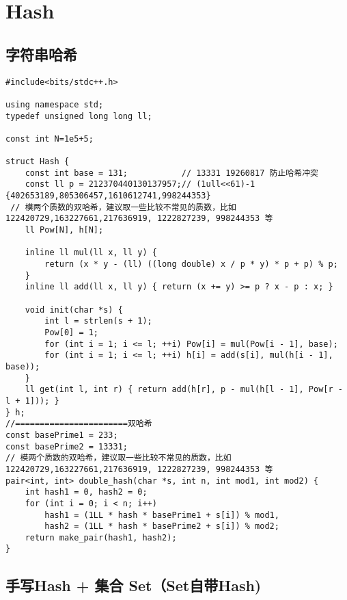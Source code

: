 \section{Hash}
\subsection{字符串哈希}
\begin{verbatim}
#include<bits/stdc++.h>

using namespace std;
typedef unsigned long long ll;

const int N=1e5+5;

struct Hash {
    const int base = 131;           // 13331 19260817 防止哈希冲突
    const ll p = 212370440130137957;// (1ull<<61)-1 {402653189,805306457,1610612741,998244353}
 // 模两个质数的双哈希，建议取一些比较不常见的质数，比如 122420729,163227661,217636919, 1222827239, 998244353 等
    ll Pow[N], h[N];
 
    inline ll mul(ll x, ll y) {
        return (x * y - (ll) ((long double) x / p * y) * p + p) % p;
    }
    inline ll add(ll x, ll y) { return (x += y) >= p ? x - p : x; } 
 
    void init(char *s) {
        int l = strlen(s + 1); 
        Pow[0] = 1; 
        for (int i = 1; i <= l; ++i) Pow[i] = mul(Pow[i - 1], base);
        for (int i = 1; i <= l; ++i) h[i] = add(s[i], mul(h[i - 1], base));
    }
    ll get(int l, int r) { return add(h[r], p - mul(h[l - 1], Pow[r - l + 1])); }
} h;
//=======================双哈希
const basePrime1 = 233;
const basePrime2 = 13331;
// 模两个质数的双哈希，建议取一些比较不常见的质数，比如 122420729,163227661,217636919, 1222827239, 998244353 等
pair<int, int> double_hash(char *s, int n, int mod1, int mod2) {
    int hash1 = 0, hash2 = 0;
    for (int i = 0; i < n; i++)
        hash1 = (1LL * hash * basePrime1 + s[i]) % mod1,
        hash2 = (1LL * hash * basePrime2 + s[i]) % mod2;
    return make_pair(hash1, hash2);
}
\end{verbatim}
\subsection{手写Hash + 集合 Set（Set自带Hash)}

